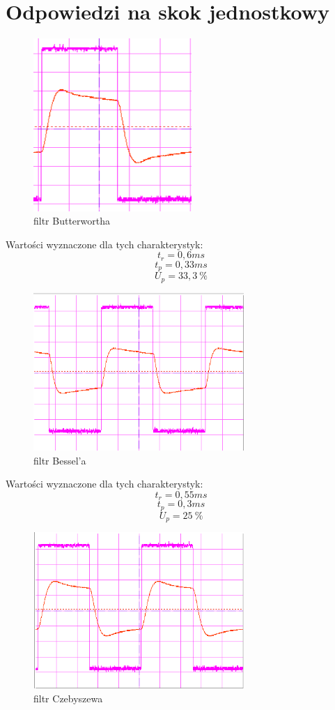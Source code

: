 \documentclass[a4paper,11pt]{article}
\begin{document}
\section{Odpowiedzi na skok jednostkowy}


\begin{figure}[H]
\begin{center}
\includegraphics[width=6cm]{obrazki/batman1prostybialymod.png}
\end{center}
\caption{filtr Butterwortha}
\end{figure}

Wartości wyznaczone dla tych charakterystyk: 
$$ t_r=0,6 ms  $$ 
$$ t_p=0,33 ms $$ 
$$ U_p= 33,3 \  \%  $$ 

\begin{figure}[H]
\begin{center}
\includegraphics[width=8cm]{obrazki/bezelprostybialy.png}
\end{center}
\caption{filtr Bessel'a}
\end{figure}

Wartości wyznaczone dla tych charakterystyk: 
$$ t_r= 0,55 ms $$ 
$$ t_p= 0,3 ms $$ 
$$ U_p= 25 \  \% $$

\begin{figure}[H]
\begin{center}
\includegraphics[width=8cm]{obrazki/tszebieszowprostzbialy.png}
\end{center}
\caption{filtr Czebyszewa}
\end{figure}
\end{document}
